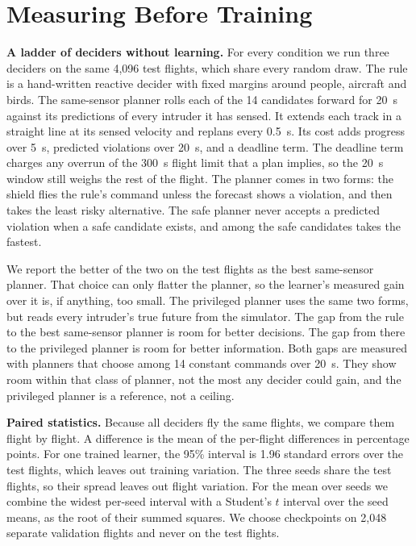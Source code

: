 \section{Measuring Before Training}\label{sec:method}

\textbf{A ladder of deciders without learning.} For every condition we run three deciders on the same 4,096 test flights, which share every random draw. The rule is a hand-written reactive decider with fixed margins around people, aircraft and birds. The same-sensor planner rolls each of the 14 candidates forward for 20~s against its predictions of every intruder it has sensed. It extends each track in a straight line at its sensed velocity and replans every 0.5~s. Its cost adds progress over 5~s, predicted violations over 20~s, and a deadline term. The deadline term charges any overrun of the 300~s flight limit that a plan implies, so the 20~s window still weighs the rest of the flight. The planner comes in two forms: the shield flies the rule's command unless the forecast shows a violation, and then takes the least risky alternative. The safe planner never accepts a predicted violation when a safe candidate exists, and among the safe candidates takes the fastest.

We report the better of the two on the test flights as the best same-sensor planner. That choice can only flatter the planner, so the learner's measured gain over it is, if anything, too small. The privileged planner uses the same two forms, but reads every intruder's true future from the simulator. The gap from the rule to the best same-sensor planner is room for better decisions. The gap from there to the privileged planner is room for better information. Both gaps are measured with planners that choose among 14 constant commands over 20~s. They show room within that class of planner, not the most any decider could gain, and the privileged planner is a reference, not a ceiling.

\textbf{Paired statistics.} Because all deciders fly the same flights, we compare them flight by flight. A difference is the mean of the per-flight differences in percentage points. For one trained learner, the 95\% interval is 1.96 standard errors over the test flights, which leaves out training variation. The three seeds share the test flights, so their spread leaves out flight variation. For the mean over seeds we combine the widest per-seed interval with a Student's $t$ interval over the seed means, as the root of their summed squares. We choose checkpoints on 2,048 separate validation flights and never on the test flights.

